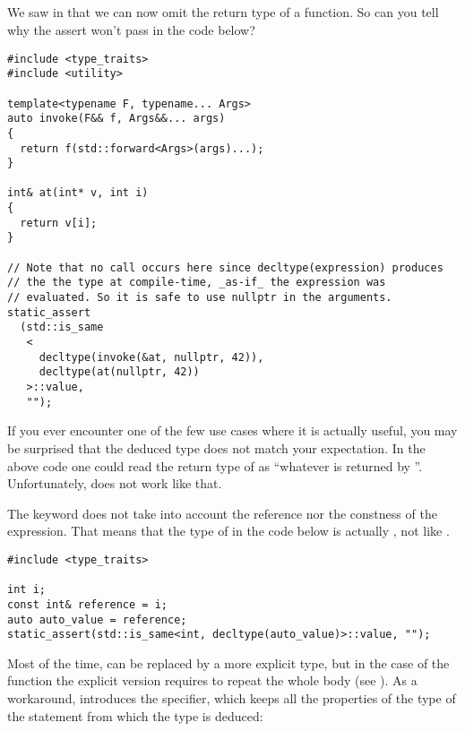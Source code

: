 \subsection{}

We saw in  that we can now omit the
return type of a function. So can you tell why the assert won't pass
in the code below?

\begin{lstlisting}
#include <type_traits>
#include <utility>

template<typename F, typename... Args>
auto invoke(F&& f, Args&&... args)
{
  return f(std::forward<Args>(args)...);
}

int& at(int* v, int i)
{
  return v[i];
}

// Note that no call occurs here since decltype(expression) produces
// the the type at compile-time, _as-if_ the expression was
// evaluated. So it is safe to use nullptr in the arguments.
static_assert
  (std::is_same
   <
     decltype(invoke(&at, nullptr, 42)),
     decltype(at(nullptr, 42))
   >::value,
   "");
\end{lstlisting}

If you ever encounter one of the few use cases where  it is
actually useful, you may be surprised that the deduced type does not
match your expectation. In the above code one could read the return
type of  as ``whatever is returned by
''. Unfortunately,  does not work like that.

The  keyword does not take into account the reference nor
the constness of the expression. That means that the type of
 in the code below is actually , not
 like .

\begin{lstlisting}
#include <type_traits>

int i;
const int& reference = i;
auto auto_value = reference;
static_assert(std::is_same<int, decltype(auto_value)>::value, "");
\end{lstlisting}

\bigskip

Most of the time,  can be replaced by a more explicit type,
but in the case of the  function the explicit version
requires to repeat the whole body (see
). As a workaround,  introduces
the  specifier, which keeps all the properties of
the type of the statement from which the type is deduced:

